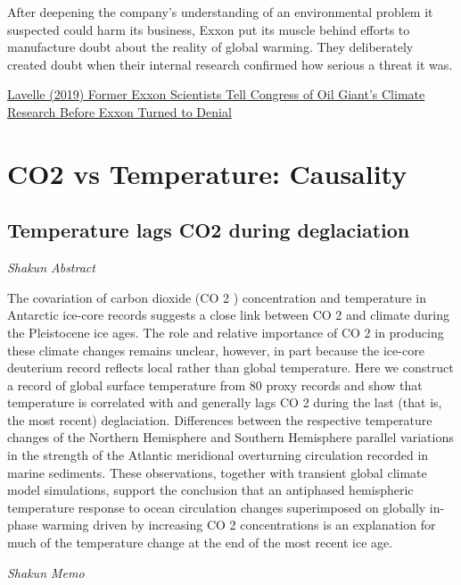 \documentclass[
]{book}
\begin{document}
After deepening the company's understanding of an environmental problem it suspected could harm its business, Exxon put its muscle behind efforts to manufacture doubt about the reality of global warming.
They deliberately created doubt when their internal research confirmed how serious a threat it was.

\href{https://insideclimatenews.org/news/24102019/exxon-scientists-climate-research-testify-congess-denial/}{Lavelle (2019) Former Exxon Scientists Tell Congress of Oil Giant's Climate Research Before Exxon Turned to Denial}

\hypertarget{co2-vs-temperature-causality}{%
\chapter{CO2 vs Temperature: Causality}\label{co2-vs-temperature-causality}}

\hypertarget{temperature-lags-co2-during-deglaciation}{%
\section{Temperature lags CO2 during deglaciation}\label{temperature-lags-co2-during-deglaciation}}

\emph{Shakun Abstract}

The covariation of carbon dioxide (CO 2 ) concentration and temperature
in Antarctic ice-core records suggests a close
link between CO 2 and climate during the Pleistocene ice ages.
The role and relative importance of CO 2 in producing these
climate changes remains unclear, however,
in part because the ice-core deuterium record reflects local rather than
global temperature.
Here we construct a record of global surface temperature from 80 proxy records and show that
temperature is correlated with and generally lags CO 2 during
the last (that is, the most recent) deglaciation.
Differences between the respective temperature changes of the Northern Hemisphere and
Southern Hemisphere parallel variations in the strength of
the Atlantic meridional overturning circulation recorded in marine sediments.
These observations, together with transient global climate model simulations,
support the conclusion that an antiphased hemispheric temperature response to
ocean circulation changes superimposed on globally in-phase warming driven by increasing
CO 2 concentrations
is an explanation for much of the temperature change at the end of the most recent ice age.

\emph{Shakun Memo}
\end{document}

